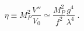 \begin{equation}
\label{eq:etadec}
\eta \equiv M_P^2 \frac{V''}{V_0} \simeq \frac{M_P^2}{f^2}
\frac{g^4}{\lambda^4} \;.  
\end{equation}

